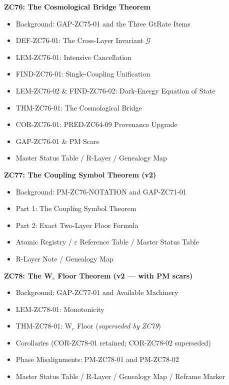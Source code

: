 \documentclass[12pt, a4paper]{article}
\begin{document}
\begin{contentsbox}[title={Part XLIX --- Part and Section Headers}]
\textbf{ZC76: The Cosmological Bridge Theorem}
\begin{itemize}[noitemsep, leftmargin=1.5em]
  \item Background: GAP-ZC75-01 and the Three GtRate Items
  \item DEF-ZC76-01: The Cross-Layer Invariant $\mathcal{G}$
  \item LEM-ZC76-01: Intensive Cancellation
  \item FIND-ZC76-01: Single-Coupling Unification
  \item LEM-ZC76-02 \& FIND-ZC76-02: Dark-Energy Equation of State
  \item THM-ZC76-01: The Cosmological Bridge
  \item COR-ZC76-01: PRED-ZC64-09 Provenance Upgrade
  \item GAP-ZC76-01 \& PM Scars
  \item Master Status Table / R-Layer / Genealogy Map
\end{itemize}

\textbf{ZC77: The Coupling Symbol Theorem (v2)}
\begin{itemize}[noitemsep, leftmargin=1.5em]
  \item Background: PM-ZC76-NOTATION and GAP-ZC71-01
  \item Part 1: The Coupling Symbol Theorem
  \item Part 2: Exact Two-Layer Floor Formula
  \item Atomic Registry / $\varepsilon$ Reference Table / Master Status Table
  \item R-Layer Note / Genealogy Map
\end{itemize}

\textbf{ZC78: The W$_c$ Floor Theorem (v2 --- with PM scars)}
\begin{itemize}[noitemsep, leftmargin=1.5em]
  \item Background: GAP-ZC77-01 and Available Machinery
  \item LEM-ZC78-01: Monotonicity
  \item THM-ZC78-01: W$_c$ Floor (\textit{superseded by ZC79})
  \item Corollaries (COR-ZC78-01 retained; COR-ZC78-02 superseded)
  \item Phase Misalignments: PM-ZC78-01 and PM-ZC78-02
  \item Master Status Table / R-Layer / Genealogy Map / Reframe Marker
\end{itemize}
\end{contentsbox}
\end{document}
